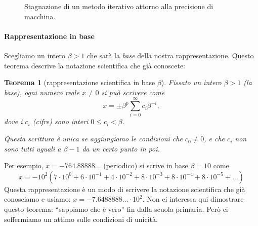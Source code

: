 \documentclass[a4paper]{report}
\newtheorem{theorem}{Teorema}[chapter]
\theoremstyle{definition}
\theoremstyle{remark}
\begin{document}
\begin{figure}
\begin{center}
        \end{center}
    \caption{Stagnazione di un metodo iterativo attorno alla precisione di macchina.} \label{fig:stagnazione}
    \end{figure}    

\paragraph{Rappresentazione in base}

Scegliamo un intero $\beta > 1$ che sarà la \emph{base} della nostra rappresentazione. Questo teorema descrive la notazione scientifica che già conoscete:
\begin{theorem}[rappresentazione scientifica in base $\beta$]
Fissato un intero $\beta > 1$ (la \emph{base}), ogni numero reale $x\neq 0$ si può scrivere come
\begin{equation} \label{rapprbase}
    x = \pm \beta^p \sum_{i=0}^\infty c_i \beta^{-i},
\end{equation}
dove i $c_i$ (\emph{cifre}) sono interi $0 \leq c_i < \beta$.

Questa scrittura è unica se aggiungiamo le condizioni che $c_0 \neq 0$, e che $c_i$ non sono tutti uguali a $\beta-1$ da un certo punto in poi.
\end{theorem}
Per esempio, $x = -764.88888\dots$ (periodico) si scrive in base $\beta=10$ come
\[
x = - 10^2 (7\cdot 10^{0} + 6\cdot 10^{-1} + 4\cdot 10^{-2} + 8 \cdot 10^{-3} + 8 \cdot 10^{-4} + 8 \cdot 10^{-5} + \dots)
\]
Questa rappresentazione è un modo di scrivere la notazione scientifica che già conosciamo e usiamo: $x= -7.6488888\ldots \cdot 10^{2}$. Non ci interessa qui dimostrare questo teorema: ``sappiamo che è vero'' fin dalla scuola primaria. Però ci soffermiamo un attimo sulle condizioni di unicità.
\end{document}
